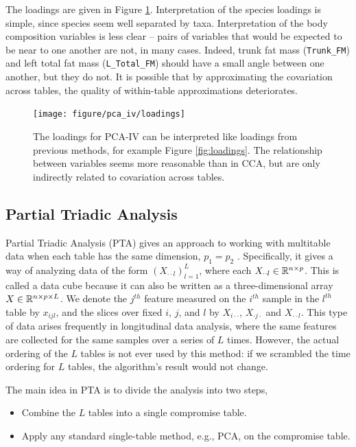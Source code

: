 \documentclass[14pt]{extarticle}
\begin{document}
The loadings are given in Figure \ref{fig:pca_iv_loadings}. Interpretation of
the species loadings is simple, since species seem well separated by taxa.
Interpretation of the body composition variables is less clear -- pairs of
variables that would be expected to be near to one another are not, in many
cases. Indeed, trunk fat mass (\texttt{Trunk\_FM}) and left total fat mass
(\texttt{L\_Total\_FM}) should have a small angle between one another, but they
do not. It is possible that by approximating the covariation across tables, the
quality of within-table approximations deteriorates.

\begin{figure}
  \centering
  \texttt{[image: figure/pca\_iv/loadings]}
  \caption{The loadings for PCA-IV can be interpreted like loadings from
    previous methods, for example Figure \ref{fig:loadings}. The relationship
    between variables seems more reasonable than in CCA, but are only indirectly
    related to covariation across tables.
    \label{fig:pca_iv_loadings} }
\end{figure}

\subsection{Partial Triadic Analysis}
\label{subsec:partial_triadic_analysis}

Partial Triadic Analysis (PTA) gives an approach to working with multitable data
when each table has the same dimension, $p_1 = p_2$ \citep{thioulouse2011simultaneous}.
Specifically, it gives a way of analyzing data of the form $\left(X_{\cdot\cdot
  l}\right)_{l = 1}^{L}$, where each $X_{\cdot\cdot l} \in \mathbb{R}^{n \times p}$.
This is called a data cube because it can also be written as a three-dimensional
array $X \in \mathbb{R}^{n \times p \times L}$. We denote the $j^{th}$ feature
measured on the $i^{th}$ sample in the $l^{th}$ table by $x_{ijl}$, and the
slices over fixed $i$, $j$, and $l$ by $X_{i \cdot \cdot}$, $X_{\cdot j \cdot}$
and $X_{\cdot \cdot l}$. This type of data arises frequently in longitudinal
data analysis, where the same features are collected for the same samples over
a series of $L$ times. However, the actual ordering of the $L$ tables is not
ever used by this method: if we scrambled the time ordering for $L$ tables, the
algorithm's result would not change.

The main idea in PTA is to divide the analysis into two steps,
\begin{itemize}
  \item Combine the $L$ tables into a single compromise table.
  \item Apply any standard single-table method, e.g., PCA, on the
    compromise table.
\end{itemize}
\end{document}
